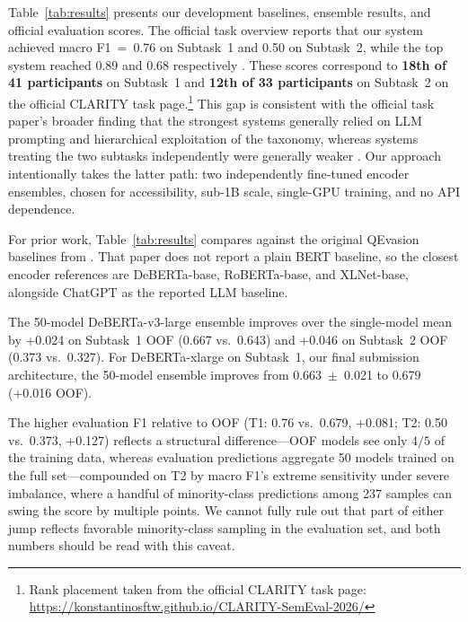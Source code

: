 \documentclass[11pt]{article}
\begin{document}
Table~\ref{tab:results} presents our development baselines, ensemble results, and official evaluation scores. The official task overview reports that our system achieved macro F1~=~0.76 on Subtask~1 and 0.50 on Subtask~2, while the top system reached 0.89 and 0.68 respectively \citep{semeval2026task6}. These scores correspond to \textbf{18th of 41 participants} on Subtask~1 and \textbf{12th of 33 participants} on Subtask~2 on the official CLARITY task page.\footnote{Rank placement taken from the official CLARITY task page: \url{https://konstantinosftw.github.io/CLARITY-SemEval-2026/}} This gap is consistent with the official task paper's broader finding that the strongest systems generally relied on LLM prompting and hierarchical exploitation of the taxonomy, whereas systems treating the two subtasks independently were generally weaker \citep{semeval2026task6}. Our approach intentionally takes the latter path: two independently fine-tuned encoder ensembles, chosen for accessibility, sub-1B scale, single-GPU training, and no API dependence.

For prior work, Table~\ref{tab:results} compares against the original QEvasion baselines from \citet{thomas2024clarity}. That paper does not report a plain BERT baseline, so the closest encoder references are DeBERTa-base, RoBERTa-base, and XLNet-base, alongside ChatGPT as the reported LLM baseline.

The 50-model DeBERTa-v3-large ensemble improves over the single-model mean by +0.024 on Subtask~1 OOF (0.667 vs.\ 0.643) and +0.046 on Subtask~2 OOF (0.373 vs.\ 0.327). For DeBERTa-xlarge on Subtask~1, our final submission architecture, the 50-model ensemble improves from 0.663~$\pm$~0.021 to 0.679 (+0.016 OOF).

The higher evaluation F1 relative to OOF (T1: 0.76 vs.\ 0.679, +0.081; T2: 0.50 vs.\ 0.373, +0.127) reflects a structural difference---OOF models see only $4/5$ of the training data, whereas evaluation predictions aggregate 50 models trained on the full set---compounded on T2 by macro F1's extreme sensitivity under severe imbalance, where a handful of minority-class predictions among 237 samples can swing the score by multiple points. We cannot fully rule out that part of either jump reflects favorable minority-class sampling in the evaluation set, and both numbers should be read with this caveat.
\end{document}
